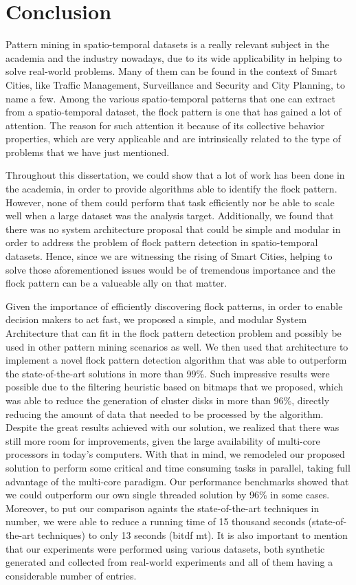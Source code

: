 \chapter{Conclusion}
\label{chp:conclusion}
Pattern mining in spatio-temporal datasets is a really relevant subject in the academia and the industry nowadays, due
to its wide applicability in helping to solve real-world problems. Many of them can be found in the context of Smart
Cities, like Traffic Management, Surveillance and Security and City Planning, to name a few. Among the various
spatio-temporal patterns that one can extract from a spatio-temporal dataset, the flock pattern is one that has gained a
lot of attention. The reason for such attention it because of its collective behavior properties, which are very
applicable and are intrinsically related to the type of problems that we have just mentioned.

Throughout this dissertation, we could show that a lot of work has been done in the academia, in order to provide
algorithms able to identify the flock pattern. However, none of them could perform that task efficiently nor be able to
scale well when a large dataset was the analysis target. Additionally, we found that there was no system architecture
proposal that could be simple and modular in order to address the problem of flock pattern detection in spatio-temporal
datasets. Hence, since we are witnessing the rising of Smart Cities, helping to solve those aforementioned issues would
be of tremendous importance and the flock pattern can be a valueable ally on that matter.

Given the importance of efficiently discovering flock patterns, in order to enable decision makers to act fast, we
proposed a simple, and modular System Architecture that can fit in the flock pattern detection problem and possibly be
used in other pattern mining scenarios as well. We then used that architecture to implement a novel flock pattern
detection algorithm that was able to outperform the state-of-the-art solutions in more than 99\%. Such impressive
results were possible due to the filtering heuristic based on bitmaps that we proposed, which was able to reduce the
generation of cluster disks in more than 96\%, directly reducing the amount of data that needed to be processed by the
algorithm. Despite the great results achieved with our solution, we realized that there was still more room for
improvements, given the large availability of multi-core processors in today's computers. With that in mind, we
remodeled our proposed solution to perform some critical and time consuming tasks in parallel, taking full advantage of
the multi-core paradigm. Our performance benchmarks showed that we could outperform our own single threaded solution by
96\% in some cases. Moreover, to put our comparison againts the state-of-the-art techniques in number, we were able to
reduce a running time of 15 thousand seconds (state-of-the-art techniques) to only 13 seconds (\ac{bitdf} \ac{mt}). It
is also important to mention that our experiments were performed using various datasets, both synthetic generated and
collected from real-world experiments and all of them having a considerable number of entries.

